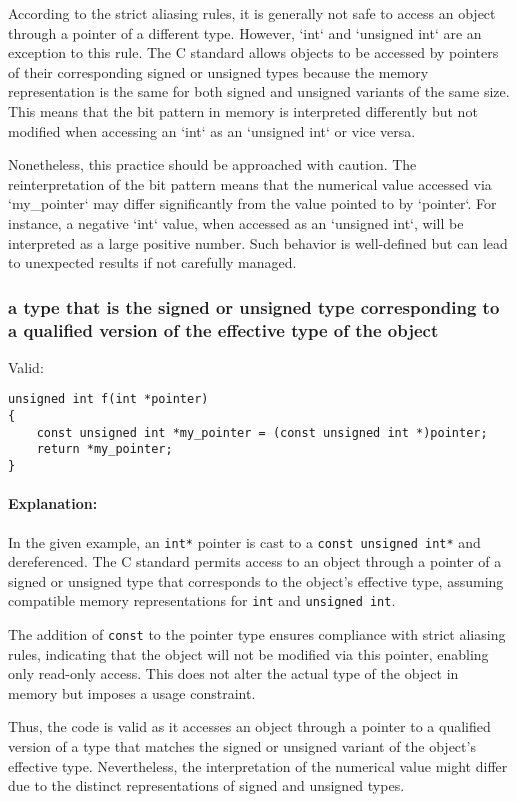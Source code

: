 \documentclass[12pt]{article}
\begin{document}
According to the strict aliasing rules, it is generally not safe to access an object through a pointer of a different type. However, `int` and `unsigned int` are an exception to this rule. The C standard allows objects to be accessed by pointers of their corresponding signed or unsigned types because the memory representation is the same for both signed and unsigned variants of the same size. This means that the bit pattern in memory is interpreted differently but not modified when accessing an `int` as an `unsigned int` or vice versa.

Nonetheless, this practice should be approached with caution. The reinterpretation of the bit pattern means that the numerical value accessed via `my\_pointer` may differ significantly from the value pointed to by `pointer`. For instance, a negative `int` value, when accessed as an `unsigned int`, will be interpreted as a large positive number. Such behavior is well-defined but can lead to unexpected results if not carefully managed.

\subsubsection{a type that is the signed or unsigned type corresponding to a qualified version of the effective type of the object}

Valid:
\begin{lstlisting}
unsigned int f(int *pointer)
{
    const unsigned int *my_pointer = (const unsigned int *)pointer;
    return *my_pointer;
}
\end{lstlisting}

\paragraph{Explanation:}
In the given example, an \texttt{int*} pointer is cast to a \texttt{const unsigned int*} and dereferenced. The C standard permits access to an object through a pointer of a signed or unsigned type that corresponds to the object's effective type, assuming compatible memory representations for \texttt{int} and \texttt{unsigned int}.

The addition of \texttt{const} to the pointer type ensures compliance with strict aliasing rules, indicating that the object will not be modified via this pointer, enabling only read-only access. This does not alter the actual type of the object in memory but imposes a usage constraint.

Thus, the code is valid as it accesses an object through a pointer to a qualified version of a type that matches the signed or unsigned variant of the object's effective type. Nevertheless, the interpretation of the numerical value might differ due to the distinct representations of signed and unsigned types.
\end{document}
